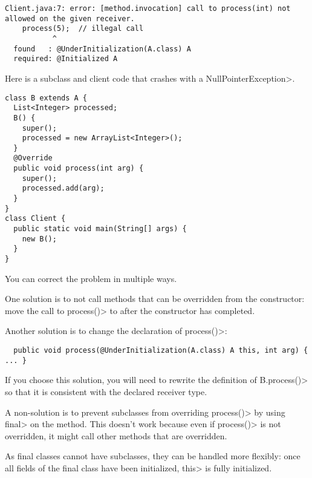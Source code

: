 \begin{Verbatim}
Client.java:7: error: [method.invocation] call to process(int) not allowed on the given receiver.
    process(5);  // illegal call
           ^
  found   : @UnderInitialization(A.class) A
  required: @Initialized A
\end{Verbatim}

Here is a subclass and client code that crashes with a \<NullPointerException>.

\begin{Verbatim}
class B extends A {
  List<Integer> processed;
  B() {
    super();
    processed = new ArrayList<Integer>();
  }
  @Override
  public void process(int arg) {
    super();
    processed.add(arg);
  }
}
class Client {
  public static void main(String[] args) {
    new B();
  }
}
\end{Verbatim}

You can correct the problem in multiple ways.

One solution is to not call methods that can be overridden from the
constructor:  move the call to \<process()> to after the constructor has
completed.

Another solution is to change the declaration of \<process()>:

\begin{Verbatim}
  public void process(@UnderInitialization(A.class) A this, int arg) { ... }
\end{Verbatim}

If you choose this solution, you will need to rewrite the definition of
\<B.process()> so that it is consistent with the declared receiver type.

A non-solution is to prevent subclasses from overriding \<process()> by
using \<final> on the method.  This doesn't work because even if
\<process()> is not overridden, it might call other methods that are
overridden.

As final classes cannot have subclasses, they can be handled more
flexibly: once all fields of the final class have been
initialized, \<this> is fully initialized.





